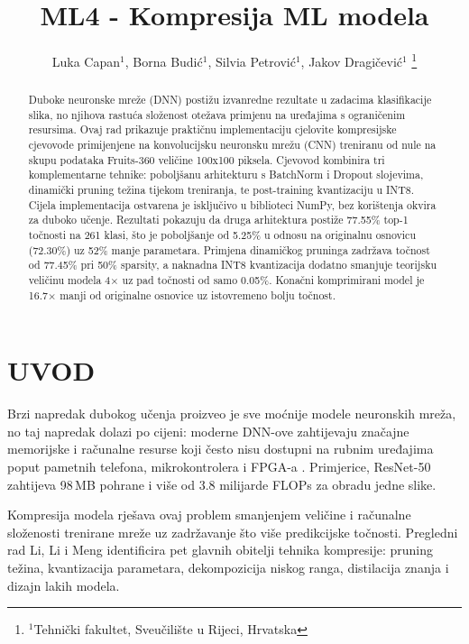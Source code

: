 \documentclass[letterpaper, 10 pt, conference]{ieeeconf}
\title{\LARGE \bf
ML4 - Kompresija ML modela\\
}
\author{
  \parbox{4in}{\centering
    Luka Capan$^{1}$, Borna Budić$^{1}$, Silvia Petrović$^{1}$, Jakov Dragičević$^{1}$
    \thanks{$^{1}$Tehnički fakultet, Sveučilište u Rijeci, Hrvatska}
  }
}
\begin{document}
\maketitle
\thispagestyle{empty}
\pagestyle{empty}

\begin{abstract}
Duboke neuronske mreže (DNN) postižu izvanredne rezultate u zadacima klasifikacije slika, no njihova rastuća složenost otežava primjenu na uređajima s ograničenim resursima.
Ovaj rad prikazuje praktičnu implementaciju cjelovite kompresijske cjevovode primijenjene na konvolucijsku neuronsku mrežu (CNN) treniranu od nule na skupu podataka Fruits-360 veličine 100x100 piksela.
Cjevovod kombinira tri komplementarne tehnike: poboljšanu arhitekturu s BatchNorm i Dropout slojevima, dinamički pruning težina tijekom treniranja, te post-training kvantizaciju u INT8.
Cijela implementacija ostvarena je isključivo u biblioteci NumPy, bez korištenja okvira za duboko učenje.
Rezultati pokazuju da druga arhitektura postiže 77.55\% top-1 točnosti na 261 klasi, što je poboljšanje od 5.25\% u odnosu na originalnu osnovicu (72.30\%) uz 52\% manje parametara.
Primjena dinamičkog pruninga zadržava točnost od 77.45\% pri 50\% sparsity, a naknadna INT8 kvantizacija dodatno smanjuje teorijsku veličinu modela 4$\times$ uz pad točnosti od samo 0.05\%.
Konačni komprimirani model je 16.7$\times$ manji od originalne osnovice uz istovremeno bolju točnost.
\end{abstract}

\section{\textbf{UVOD}}

Brzi napredak dubokog učenja proizveo je sve moćnije modele neuronskih mreža, no taj napredak dolazi po cijeni: moderne DNN-ove zahtijevaju značajne memorijske i računalne resurse koji često nisu dostupni na rubnim uređajima poput pametnih telefona, mikrokontrolera i FPGA-a \cite{li2023survey}.
Primjerice, ResNet-50 zahtijeva 98\,MB pohrane i više od 3.8 milijarde FLOPs za obradu jedne slike.

Kompresija modela rješava ovaj problem smanjenjem veličine i računalne složenosti trenirane mreže uz zadržavanje što više predikcijske točnosti.
Pregledni rad Li, Li i Meng \cite{li2023survey} identificira pet glavnih obitelji tehnika kompresije: pruning težina, kvantizacija parametara, dekompozicija niskog ranga, distilacija znanja i dizajn lakih modela.
\end{document}
